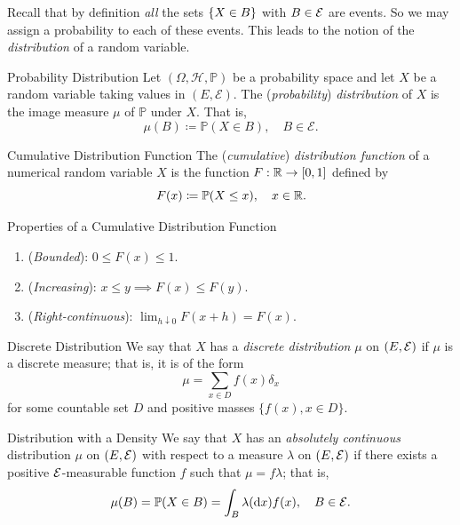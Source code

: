 Recall that by definition \textit{all} the sets $\{X \in B\}$ with $B \in \mathcal{E}$ are events. So we
may assign a probability to each of these events. This leads to the notion of the
\textit{distribution} of a random variable.

\begin{defn}{Probability Distribution}{}
	Let $(\Omega, \mathcal{H}, \mathbb{P})$ be a probability space and let $X$ be a random variable taking values in $(E, \mathcal{E})$. The (\textit{probability}) \textit{distribution} of $X$ is the image measure $\mu$ of $\mathbb{P}$ under $X$. That is,
	\begin{equation}
		\mu(B) \coloneqq \mathbb{P}(X \in B), \quad B \in \mathcal{E}.
		\label{eq:ProbabilityDistributionDef}
	\end{equation}
\end{defn}

\begin{defn}{Cumulative Distribution Function}{}
	The (\textit{cumulative}) \textit{distribution function} of a numerical random variable $X$ is the function $F : \mathbb{R} \to [0, 1]$ defined by
	\begin{equation}
		F(x) \coloneqq \mathbb{P}(X \le x), \quad x \in \mathbb{R}.
		\label{eq:CumulativeDistributionFunctionDef}
	\end{equation}
\end{defn}

\begin{prop}{Properties of a Cumulative Distribution Function}{}
	\begin{enumerate}
		\item (\textit{Bounded}): $0 \le F(x) \le 1$.
		\item (\textit{Increasing}): $x \le y \implies F(x) \le F(y)$.
		\item (\textit{Right-continuous}): $\lim_{h \downarrow 0} F(x + h) = F(x)$.
	\end{enumerate}
\end{prop}

\begin{defn}{Discrete Distribution}{}
	We say that $X$ has a \textit{discrete distribution} $\mu$ on $(E, \mathcal{E})$ if $\mu$ is a discrete measure; that is, it is of the form
	\begin{equation*}
		\mu = \sum_{x \in D} f(x) \delta_x
	\end{equation*}
	for some countable set $D$ and positive masses $\{f(x), x \in D\}$.
\end{defn}

\begin{defn}{Distribution with a Density}{}
	We say that $X$ has an \textit{absolutely continuous} distribution $\mu$ on $(E, \mathcal{E})$ with respect to a measure $\lambda$ on $(E, \mathcal{E})$ if there exists a positive $\mathcal{E}$-measurable function $f$ such that $\mu = f \lambda$; that is,
	\begin{equation*}
		\mu(B) = \mathbb{P}(X \in B) = \int_B \lambda(\mathrm{d} x) f(x), \quad B \in \mathcal{E}.
	\end{equation*}
\end{defn}


